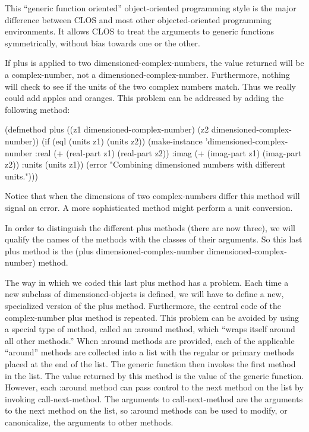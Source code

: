 This ``generic function oriented'' object-oriented programming style
is the major difference between CLOS and most other objected-oriented
programming environments.  It allows CLOS to treat the arguments to
generic functions symmetrically, without bias towards one or the
other.

If {\sf plus} is applied to two {\sf dimensioned-complex-numbers}, the
value returned will be a {\sf complex-number}, not a {\sf
dimensioned-complex-number}.  Furthermore, nothing will check to see
if the units of the two complex numbers match. Thus we really could
add apples and oranges. This problem can be addressed by adding the
following method:
\begin{code}  
(defmethod plus ((z1 dimensioned-complex-number) (z2 dimensioned-complex-number))
  (if (eql (units z1) (units z2)) 
      (make-instance 'dimensioned-complex-number 
                     :real (+ (real-part z1) (real-part z2)) 
                     :imag (+ (imag-part z1) (imag-part z2)) 
                     :units (units z1))
      (error "Combining dimensioned numbers with different units.")))
\end{code}
  
\noindent
Notice that when the dimensions of two {\sf complex-numbers} differ
this method will signal an error. A more sophisticated method might
perform a unit conversion.
  
In order to distinguish the different {\sf plus} methods
(there are now three), we will qualify the names of the
methods with the classes of their arguments. So this
last {\sf plus} method is the {\sf (plus dimensioned-complex-number
dimensioned-complex-number)} method.
  
The way in which we coded this last {\sf plus} method has a problem.
Each time a new subclass of {\sf dimensioned-objects} is defined, we
will have to define a new, specialized version of the {\sf plus}
method. Furthermore, the central code of the complex-number {\sf plus}
method is repeated.  This problem can be avoided by using a special
type of method, called an {\sf :around} method, which ``wraps itself
around all other methods.''  When {\sf :around} methods are provided,
each of the applicable ``around'' methods are collected into a list
with the regular or primary methods placed at the end of the list. The
generic function then invokes the first method in the list. The value
returned by this method is the value of the generic function. However,
each {\sf :around} method can pass control to the next method on the
list by invoking {\sf call-next-method}. The arguments to {\sf
call-next-method} are the arguments to the next method on the list, 
so {\sf :around} methods can be used to modify, or canonicalize, the
arguments to other methods.
  
